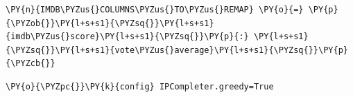 \begin{tcolorbox}[breakable, size=fbox, boxrule=1pt, pad at break*=1mm,colback=cellbackground, colframe=cellborder]
\begin{Verbatim}[commandchars=\\\{\}]
\PY{n}{IMDB\PYZus{}COLUMNS\PYZus{}TO\PYZus{}REMAP} \PY{o}{=} \PY{p}{\PYZob{}}\PY{l+s+s1}{\PYZsq{}}\PY{l+s+s1}{imdb\PYZus{}score}\PY{l+s+s1}{\PYZsq{}}\PY{p}{:} \PY{l+s+s1}{\PYZsq{}}\PY{l+s+s1}{vote\PYZus{}average}\PY{l+s+s1}{\PYZsq{}}\PY{p}{\PYZcb{}}
\end{Verbatim}
\end{tcolorbox}

    \begin{tcolorbox}[breakable, size=fbox, boxrule=1pt, pad at break*=1mm,colback=cellbackground, colframe=cellborder]
\begin{Verbatim}[commandchars=\\\{\}]
\PY{o}{\PYZpc{}}\PY{k}{config} IPCompleter.greedy=True
\end{Verbatim}
\end{tcolorbox}

